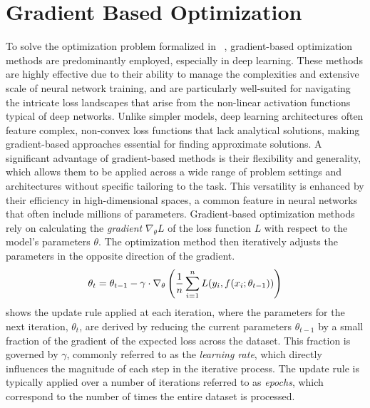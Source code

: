 \section{Gradient Based Optimization}
To solve the optimization problem formalized in ~, gradient-based
optimization methods are predominantly employed, especially in deep learning.
These methods are highly effective due to their ability to manage the
complexities and extensive scale of neural network training, and are
particularly well-suited for navigating the intricate loss landscapes that arise
from the non-linear activation functions typical of deep networks. Unlike
simpler models, deep learning architectures often feature complex, non-convex
loss functions that lack analytical solutions, making gradient-based approaches
essential for finding approximate solutions. A significant advantage of
gradient-based methods is their flexibility and generality, which allows them to
be applied across a wide range of problem settings and architectures without
specific tailoring to the task. This versatility is enhanced by their efficiency
in high-dimensional spaces, a common feature in neural networks that often
include millions of parameters.
Gradient-based optimization methods rely on calculating the
\emph{gradient}
$\nabla_\theta L$ of the loss function $L$ with respect to the model's
parameters $\theta$. The optimization method then iteratively adjusts the
parameters in the opposite direction of the gradient.
\begin{equation}
    \labeq{2_3}
    \theta_t = \theta_{t-1} - \gamma \cdot \nabla_{\theta} \left ( \frac{1}{n} \sum^n_{i=1} L(y_i, f(x_i; \theta_{t-1})) \right )
\end{equation}
 shows the update rule applied at each iteration, where the
parameters for the next iteration, $\theta_t$, are derived by reducing the
current parameters $\theta_{t-1}$ by a small fraction of the gradient of the
expected loss across the dataset. This fraction is governed by $\gamma$,
commonly referred to as the \emph{learning rate}, which directly influences the
magnitude of each step in the iterative process. The update rule is typically
applied over a number of iterations referred to as \emph{epochs}, which
correspond to the number of times the entire dataset is processed.


